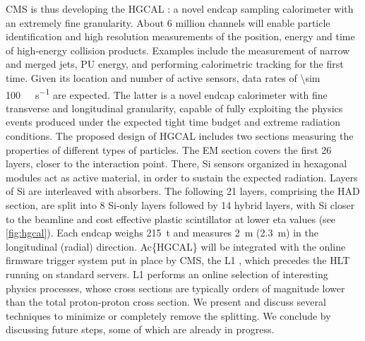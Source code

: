 \documentclass[11pt]{article}
\begin{document}
\Ac{CMS} \cite{cms_collab} is thus developing the \ac{HGCAL} \cite{hgcalTDR}: a novel endcap sampling calorimeter with an extremely fine granularity.
About \num{6} million channels will enable particle identification and high resolution measurements of the position, energy and time of high-energy collision products.
Examples include the measurement of narrow and merged jets, \ac{PU} energy, and performing calorimetric tracking for the first time.
Given its location and number of active sensors, data rates of \SI{\sim 100}{\tera\byte\per\second} are expected.
The latter is a novel endcap calorimeter with fine transverse and longitudinal granularity, capable of fully exploiting the physics events produced under the expected tight time budget and extreme radiation conditions.
The proposed design of \ac{HGCAL} includes two sections measuring the properties of different types of particles.
The \ac{EM} section covers the first 26 layers, closer to the interaction point.
There, \ac{Si} sensors organized in hexagonal modules act as active material, in order to sustain the expected radiation.
Layers of \ac{Si} are interleaved with absorbers.
The following 21 layers, comprising the \ac{HAD} section, are split into 8 \ac{Si}-only layers followed by 14 hybrid layers, with \ac{Si} closer to the beamline and cost effective plastic scintillator at lower \ac{eta} values (see \cref{fig:hgcal}). 
Each endcap weighs \SI{215}{\tonne} and measures \SI{2}{\meter} (\SI{2.3}{\meter}) in the longitudinal (radial) direction.
Ac\{HGCAL\} will be integrated with the online firmware trigger system put in place by \ac{CMS}, the \ac{L1} \cite{l1TDR}, which precedes the \ac{HLT} running on standard servers.
\Ac{L1} performs an online selection of interesting physics processes, whose cross sections are typically orders of magnitude lower than the total proton-proton cross section.
We present and discuss several techniques to minimize or completely remove the splitting.
We conclude by discussing future steps, some of which are already in progress.
\end{document}

